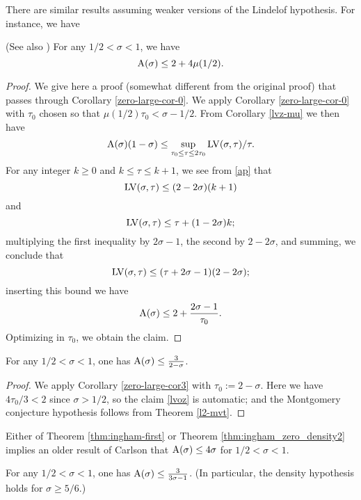 There are similar results assuming weaker versions of the Lindelof hypothesis. For instance, we have

\begin{theorem}\label{thm:ingham-first} \cite{ingham_difference_1937} (See also \cite{titchmarsh_theory_1986}) For any $1/2 < \sigma < 1$, we have
    $$ \mathrm{A}(\sigma) \leq 2 + 4 \mu(1/2).$$
\end{theorem}

\begin{proof} We give here a proof (somewhat different from the original proof) that passes through Corollary \ref{zero-large-cor-0}.
We apply Corollary \ref{zero-large-cor-0} with $\tau_0$ chosen so that $\mu(1/2) \tau_0 < \sigma-1/2$. From Corollary \ref{lvz-mu} we then have
$$ \mathrm{A}(\sigma)(1-\sigma) \leq \sup_{\tau_0 \leq \tau \leq 2\tau_0} \mathrm{LV}(\sigma,\tau)/\tau.$$
For any integer $k \geq 0$ and $k \leq \tau \leq k+1$, we see from \eqref{ap} that
$$ \mathrm{LV}(\sigma,\tau) \leq (2-2\sigma)(k+1)$$
and
$$ \mathrm{LV}(\sigma,\tau) \leq \tau + (1-2\sigma)k;$$
multiplying the first inequality by $2\sigma-1$, the second by $2-2\sigma$, and summing, we conclude that
$$ \mathrm{LV}(\sigma,\tau) \leq (\tau + 2\sigma-1) (2-2\sigma);$$
inserting this bound we have
$$ \mathrm{A}(\sigma) \leq 2 + \frac{2\sigma-1}{\tau_0}.$$
Optimizing in $\tau_0$, we obtain the claim.
\end{proof}

\begin{theorem}\label{thm:ingham_zero_density2}\cite{ingham_estimation_1940} For any $1/2 < \sigma < 1$, one has $\mathrm{A}(\sigma) \leq \frac{3}{2-\sigma}$.
\end{theorem}
\derived
{}

\begin{proof}
We apply Corollary \ref{zero-large-cor3} with $\tau_0 := 2-\sigma$.  Here we have $4\tau_0/3 < 2$ since $\sigma>1/2$, so the claim \eqref{lvoz} is automatic; and the Montgomery conjecture hypothesis follows from Theorem \ref{l2-mvt}.
\end{proof}

Either of Theorem \ref{thm:ingham-first} or Theorem \ref{thm:ingham_zero_density2} implies an older result of Carlson \cite{carlson_uber_1921} that $\mathrm{A}(\sigma) \le 4\sigma$ for $1/2 < \sigma < 1$.

\begin{theorem}\label{huxley-bound}\cite{Huxley} For any $1/2 < \sigma < 1$, one has $\mathrm{A}(\sigma) \leq \frac{3}{3\sigma-1}$. (In particular, the density hypothesis holds for $\sigma \geq 5/6$.)
\end{theorem}
\derived
{}

